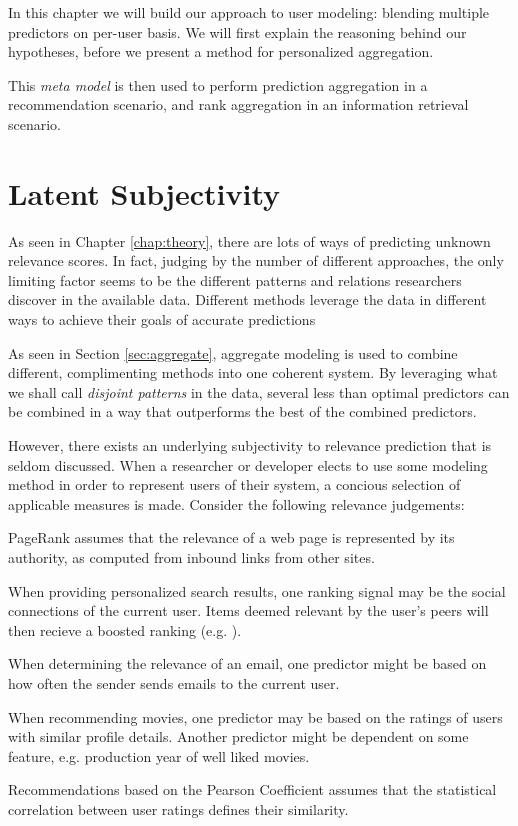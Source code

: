 In this chapter we will build our approach to user modeling:
blending multiple predictors on per-user basis.
We will first explain the reasoning behind our hypotheses,
before we present a method for personalized aggregation.

This \emph{meta model} is then used to perform prediction aggregation in a recommendation scenario,
and rank aggregation in an information retrieval scenario.


\section{Latent Subjectivity}

As seen in Chapter \ref{chap:theory}, 
there are lots of ways of predicting unknown relevance scores. 
In fact, judging by the number of different approaches,
the only limiting factor seems to be the different 
patterns and relations researchers discover in the available data.
Different methods leverage the data in different ways
to achieve their goals of accurate predictions

As seen in Section \ref{sec:aggregate},
aggregate modeling is used to combine different, complimenting
methods into one coherent system.
By leveraging what we shall call \emph{disjoint patterns}
in the data, several less than optimal predictors
can be combined in a way that outperforms the best
of the combined predictors.

However, there exists an underlying subjectivity to 
relevance prediction that is seldom discussed.
When a researcher or developer elects to use some modeling method
in order to represent users of their system,
a concious selection of applicable measures is made.
Consider the following relevance judgements:

\begin{itemize*}
  \item PageRank \citep{Bender2005} assumes that the relevance of a web page is 
  represented by its authority, as computed from inbound links from other sites.
  \item When providing personalized search results, one ranking signal may be 
  the social connections of the current user. Items deemed relevant by the user's 
  peers will then recieve a boosted ranking (e.g. \cite{Carmel2009}).
  \item When determining the relevance of an email, one predictor might be based
  on how often the sender sends emails to the current user.
  \item When recommending movies, one predictor may be based on the ratings
  of users with similar profile details. Another predictor might be 
  dependent on some feature, e.g. production year of well liked movies.
  \item Recommendations based on the Pearson Coefficient \cite[p11]{Segaran2007}
  assumes that the statistical correlation between user ratings defines their 
  similarity.
\end{itemize*}

